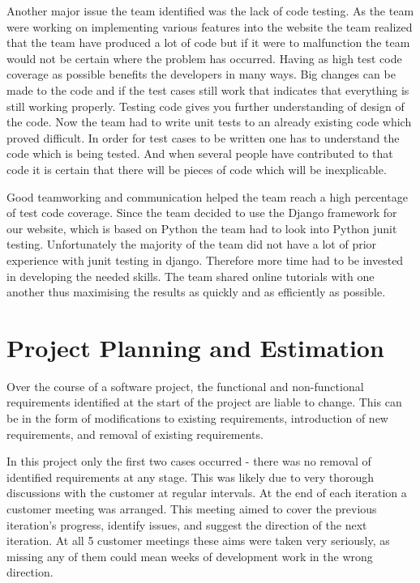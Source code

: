 \documentclass{l3proj}
\begin{document}

Another major issue the team identified was the lack of code testing. As the team were working on implementing various features into the website the team realized that the team have produced a lot of code but if it were to malfunction the team would not be certain where the problem has occurred. Having as high test code coverage as possible benefits the developers in many ways. Big changes can be made to the code and if the test cases still work that indicates that everything is still working properly. Testing code gives you further understanding of
design of the code. Now the team had to write unit tests to an already existing code which proved difficult. In order for test cases to be written one has to understand the code which is being tested. And when several people have contributed to that code it is certain that there will be pieces of code which will be inexplicable.

Good teamworking and communication helped the team reach a high percentage of test code coverage. Since the team decided to use the Django framework for our website, which is based on Python the team had to look into Python junit testing. Unfortunately the majority of the team did not have a lot of prior experience with junit testing in django. Therefore more time had to be invested in developing the needed skills. The team shared online tutorials with one another thus maximising the results as quickly and as efficiently as possible.



\section{Project Planning and Estimation}
\label{sec:planning}

Over the course of a software project, the functional and non-functional requirements identified at the start of the project are liable to change. This can be in the form of modifications to existing requirements, introduction of new requirements, and removal of existing requirements.

In this project only the first two cases occurred - there was no removal of identified requirements at any stage. This was likely due to very thorough discussions with the customer at regular intervals. At the end of each iteration a customer meeting was arranged. This meeting aimed to cover the previous iteration's progress, identify issues, and suggest the direction of the next iteration. At all 5 customer meetings these aims were taken very seriously, as missing any of them could mean weeks of development work in the wrong direction.
\end{document}

